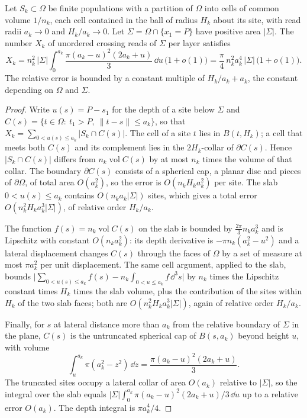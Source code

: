 \begin{proposition}
\label{prop:crossing-reads-per-area}
Let $S_k\subset\Omega$ be finite populations with a partition of $\Omega$
into cells of common volume $1/n_k$, each cell contained in the ball of
radius $H_k$ about its site, with read radii $a_k\to0$ and
$H_k/a_k\to0$. Let $\Sigma=\Omega\cap\{x_1=P\}$ have positive area
$|\Sigma|$. The number $X_k$ of unordered crossing reads of $\Sigma$ per
layer satisfies
\begin{equation}
 X_k=n_k^2\,|\Sigma|\int_0^{a_k}\frac{\pi(a_k-u)^2(2a_k+u)}{3}\,\dd u\,
     \bigl(1+o(1)\bigr)
    =\frac{\pi}{4}\,n_k^2a_k^4\,|\Sigma|\,\bigl(1+o(1)\bigr).
 \label{eq:crossing-read-density}
\end{equation}
The relative error is bounded by a constant multiple of $H_k/a_k+a_k$,
the constant depending on $\Omega$ and $\Sigma$.
\end{proposition}
\begin{proof}
Write $u(s)=P-s_1$ for the depth of a site below $\Sigma$ and
$C(s)=\{t\in\Omega:\ t_1>P,\ \|t-s\|\leq a_k\}$, so that
$X_k=\sum_{0<u(s)\leq a_k}|S_k\cap C(s)|$. The cell of a site $t$ lies in
$B(t,H_k)$; a cell that meets both $C(s)$ and its complement lies in the
$2H_k$-collar of $\partial C(s)$. Hence $|S_k\cap C(s)|$ differs from
$n_k\operatorname{vol}C(s)$ by at most $n_k$ times the volume of that
collar. The boundary $\partial C(s)$ consists of a spherical cap, a planar
disc and pieces of $\partial\Omega$, of total area $O(a_k^2)$, so the
error is $O(n_kH_ka_k^2)$ per site. The slab $0<u(s)\leq a_k$ contains
$O(n_ka_k|\Sigma|)$ sites, which gives a total error $O(n_k^2H_ka_k^3|\Sigma|)$,
of relative order $H_k/a_k$.

The function $f(s)=n_k\operatorname{vol}C(s)$ on the slab is bounded by
$\frac{2\pi}{3}n_ka_k^3$ and is Lipschitz with constant $O(n_ka_k^2)$: its
depth derivative is $-\pi n_k(a_k^2-u^2)$ and a lateral displacement changes
$C(s)$ through the faces of $\Omega$ by a set of measure at most $\pi a_k^2$
per unit displacement. The same cell argument, applied to the slab, bounds
$\bigl|\sum_{0<u(s)\leq a_k}f(s)-n_k\int_{0<u\leq a_k}f\,\dd^3s\bigr|$ by
$n_k$ times the Lipschitz constant times $H_k$ times the slab volume, plus
the contribution of the sites within $H_k$ of the two slab faces; both are
$O(n_k^2H_ka_k^3|\Sigma|)$, again of relative order $H_k/a_k$.

Finally, for $s$ at lateral distance more than $a_k$ from the relative
boundary of $\Sigma$ in the plane, $C(s)$ is the untruncated spherical cap
of $B(s,a_k)$ beyond height $u$, with volume
\[
 \int_u^{a_k}\pi(a_k^2-z^2)\,\dd z=\frac{\pi(a_k-u)^2(2a_k+u)}{3}.
\]
The truncated sites occupy a lateral collar of area $O(a_k)$ relative to
$|\Sigma|$, so the integral over the slab equals
$|\Sigma|\int_0^{a_k}\pi(a_k-u)^2(2a_k+u)/3\,\dd u$ up to a relative error
$O(a_k)$. The depth integral is $\pi a_k^4/4$.
\end{proof}

